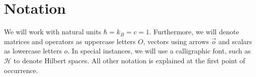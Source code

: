     \chapter*{Notation}
    We will work with natural units $\hbar = k_B = c = 1$. Furthermore, we will denote matrices and operators as uppercase letters $O$, vectors using arrows $\Vec{o}$ and scalars as lowercase letters $o$. In special instances, we will use a calligraphic font, such as $\mathcal{H}$ to denote Hilbert spaces. All other notation is explained at the first point of occurrence.

\endgroup
